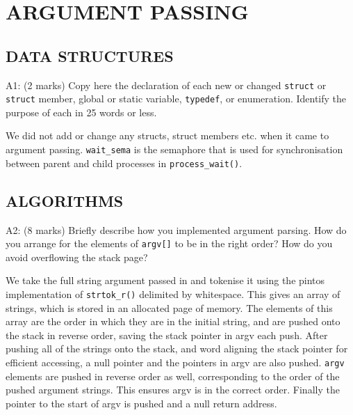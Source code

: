 \section{ARGUMENT PASSING}

\subsection*{DATA STRUCTURES}

\noindent A1: (2 marks)
Copy here the declaration of each new or changed \texttt{struct} or \texttt{struct} member, global or static variable, \texttt{typedef}, or enumeration.  Identify the purpose of each in 25 words or less.

We did not add or change any structs, struct members etc. when it came to argument passing. \texttt{wait\_sema} is the semaphore that is used for synchronisation between parent and child processes in \texttt{process\_wait()}.





\subsection*{ALGORITHMS}

\noindent A2: (8 marks)
Briefly describe how you implemented argument parsing.  How do
you arrange for the elements of \texttt{argv[]} to be in the right order?
How do you avoid overflowing the stack page?


We take the full string argument passed in and tokenise it using the pintos implementation of \texttt{strtok\_r()} delimited by whitespace. This gives an array of strings, which is stored in an allocated page of memory. The elements of this array are the order in which they are in the initial string, and are pushed onto the stack in reverse order, saving the stack pointer in argv each push. After pushing all of the strings onto the stack, and word aligning the stack pointer for efficient accessing, a null pointer and the pointers in argv are also pushed. \texttt{argv} elements are pushed in reverse order as well, corresponding to the order of the pushed argument strings. This ensures argv is in the correct order. Finally the pointer to the start of argv is pushed and a null return address.

